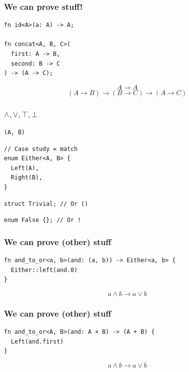 \documentclass[UTF-8]{ctexbeamer}
\begin{document}
\begin{frame}[fragile]
  \frametitle{We can prove stuff!}

  \begin{verbatim}
fn id<A>(a: A) -> A;

fn concat<A, B, C>(
  first: A -> B,
  second: B -> C
) -> (A -> C);
  \end{verbatim}

  $$
  A \rightarrow A
  $$
  $$
  (A \rightarrow B) \rightarrow (B \rightarrow C) \rightarrow (A \rightarrow C)
  $$
\end{frame}

\begin{frame}[fragile]
  \frametitle{$\land, \lor, \top, \bot$}

  \pause
  \begin{verbatim}
(A, B)
  \end{verbatim}

  \pause
  \begin{verbatim}
// Case study = match
enum Either<A, B> {
  Left(A),
  Right(B),
}
  \end{verbatim}

  \pause
  \begin{verbatim}
struct Trivial; // Or ()
  \end{verbatim}

  \pause
  \begin{verbatim}
enum False {}; // Or !
  \end{verbatim}
\end{frame}

\begin{frame}[fragile]
  \frametitle{We can prove (other) stuff}

  \begin{verbatim}
fn and_to_or<a, b>(and: (a, b)) -> Either<a, b> {
  Either::left(and.0)
}
  \end{verbatim}

  $$
  a \land b \rightarrow a \lor b
  $$
\end{frame}

\begin{frame}[fragile]
  \frametitle{We can prove (other) stuff}

  \begin{verbatim}
fn and_to_or<A, B>(and: A × B) -> (A + B) {
  Left(and.first)
}
  \end{verbatim}

  $$
  a \land b \rightarrow a \lor b
  $$
\end{frame}
\end{document}

